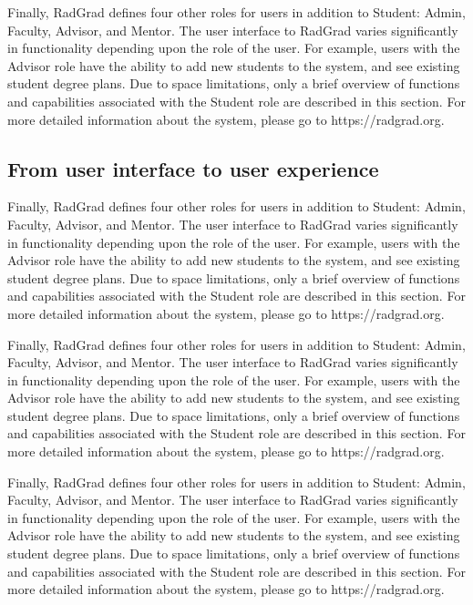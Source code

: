 \documentclass[acmsmall]{acmart}
\begin{document}
Finally, RadGrad defines four other roles for users in addition to Student: Admin, Faculty, Advisor, and Mentor. The user interface to RadGrad varies significantly in functionality depending upon the role of the user.  For example, users with the Advisor role have the ability to add new students to the system, and see existing student degree plans. Due to space limitations, only a brief overview of functions and capabilities associated with the Student role are described in this section. For more detailed information about the system, please go to https://radgrad.org.

\subsection{From user interface to user experience}

Finally, RadGrad defines four other roles for users in addition to Student: Admin, Faculty, Advisor, and Mentor. The user interface to RadGrad varies significantly in functionality depending upon the role of the user.  For example, users with the Advisor role have the ability to add new students to the system, and see existing student degree plans. Due to space limitations, only a brief overview of functions and capabilities associated with the Student role are described in this section. For more detailed information about the system, please go to https://radgrad.org.

Finally, RadGrad defines four other roles for users in addition to Student: Admin, Faculty, Advisor, and Mentor. The user interface to RadGrad varies significantly in functionality depending upon the role of the user.  For example, users with the Advisor role have the ability to add new students to the system, and see existing student degree plans. Due to space limitations, only a brief overview of functions and capabilities associated with the Student role are described in this section. For more detailed information about the system, please go to https://radgrad.org.

Finally, RadGrad defines four other roles for users in addition to Student: Admin, Faculty, Advisor, and Mentor. The user interface to RadGrad varies significantly in functionality depending upon the role of the user.  For example, users with the Advisor role have the ability to add new students to the system, and see existing student degree plans. Due to space limitations, only a brief overview of functions and capabilities associated with the Student role are described in this section. For more detailed information about the system, please go to https://radgrad.org.
\end{document}
